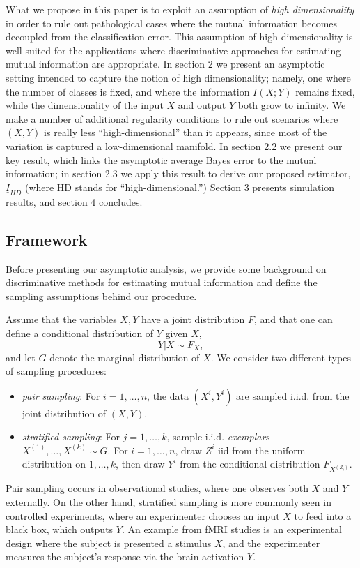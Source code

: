 \documentclass{article}
\begin{document}
What we propose in this paper is to exploit an assumption of
\emph{high dimensionality} in order to rule out pathological cases
where the mutual information becomes decoupled from the classification
error.  This assumption of high dimensionality is well-suited for the
applications where discriminative approaches for estimating mutual
information are appropriate.  In section 2 we present an asymptotic
setting intended to capture the notion of high dimensionality; namely,
one where the number of classes is fixed, and where the information
$I(X; Y)$ remains fixed, while the dimensionality of the input $X$ and
output $Y$ both grow to infinity.  We make a number of additional
regularity conditions to rule out scenarios where $(X, Y)$ is really
less ``high-dimensional'' than it appears, since most of the variation
is captured a low-dimensional manifold.  In section 2.2 we present our
key result, which links the asymptotic average Bayes error to the
mutual information; in section 2.3 we apply this result to derive our
proposed estimator, $\underline{I}_{HD}$ (where HD stands for ``high-dimensional.'')  Section 3 presents
simulation results, and section 4 concludes.

\subsection{Framework}

Before presenting our asymptotic analysis, we provide some background
on discriminative methods for estimating mutual information and
define the sampling assumptions behind our procedure.

Assume that the variables $X, Y$ have a joint distribution $F$, and
that one can define a conditional distribution of $Y$ given $X$,
\[
Y|X \sim F_X,
\]
and let $G$ denote the marginal distribution of $X$.
We consider two different types of sampling procedures:
\begin{itemize}
\item \emph{pair sampling}:  For $i = 1,\hdots, n$, the data $(X^i, Y^i)$ are sampled i.i.d. from the joint distribution of $(X, Y)$.
\item \emph{stratified sampling}:  For $j = 1,\hdots, k$, sample i.i.d. \emph{exemplars} $X^{(1)},\hdots, X^{(k)} \sim G$.  For $i = 1,\hdots, n$, draw $Z^i$ iid from the uniform distribution on $1,\hdots, k$, then draw $Y^i$ from the conditional distribution $F_{X^{(Z_i)}}$.
\end{itemize}
Pair sampling occurs in observational studies, where one observes both $X$ and $Y$ externally.  On the other hand, stratified sampling is more commonly seen in controlled experiments, where an experimenter chooses an input $X$ to feed into a black box, which outputs $Y$.  An example from fMRI studies is an experimental design where the subject is presented a stimulus $X$, and the experimenter measures the subject's response via the brain activation $Y$.
\end{document}
